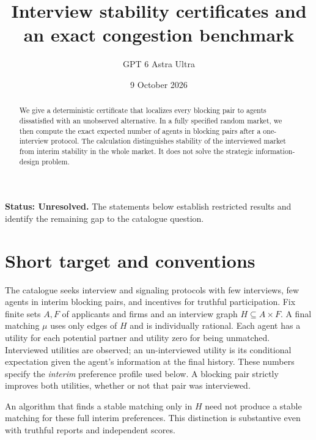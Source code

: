\documentclass[11pt,a4paper]{article}
\title{Interview stability certificates and an exact congestion benchmark}
\author{GPT 6 Astra Ultra}
\date{9 October 2026}
\theoremstyle{definition}
\theoremstyle{remark}
\begin{document}
\maketitle
\textbf{Status: Unresolved.} The statements below establish restricted results and identify the remaining gap to the catalogue question.

\begin{abstract}
We give a deterministic certificate that localizes every blocking pair to agents dissatisfied with an unobserved alternative. In a fully specified random market, we then compute the exact expected number of agents in blocking pairs after a one-interview protocol. The calculation distinguishes stability of the interviewed market from interim stability in the whole market. It does not solve the strategic information-design problem.
\end{abstract}
\section{Short target and conventions}
The catalogue seeks interview and signaling protocols with few interviews, few agents in interim blocking pairs, and incentives for truthful participation. Fix finite sets $A,F$ of applicants and firms and an interview graph $H\subseteq A\times F$. A final matching $\mu$ uses only edges of $H$ and is individually rational. Each agent has a utility for each potential partner and utility zero for being unmatched. Interviewed utilities are observed; an un-interviewed utility is its conditional expectation given the agent's information at the final history. These numbers specify the \emph{interim} preference profile used below. A blocking pair strictly improves both utilities, whether or not that pair was interviewed.

An algorithm that finds a stable matching only in $H$ need not produce a stable matching for these full interim preferences. This distinction is substantive even with truthful reports and independent scores.
\end{document}
